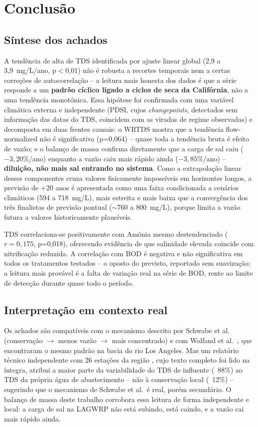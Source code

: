 \section{Conclusão}

\subsection{Síntese dos achados}

A tendência de alta de TDS identificada por ajuste linear global (2,9 a 3,9~mg/L/ano, p$<$0,01) não é robusta a recortes temporais nem a certas correções de autocorrelação -- a leitura mais honesta dos dados é que a série responde a um \textbf{padrão cíclico ligado a ciclos de seca da Califórnia}, não a uma tendência monotônica. Essa hipótese foi confirmada com uma variável climática externa e independente (PDSI, cujos \textit{changepoints}, detectados sem informação das datas do TDS, coincidem com as viradas de regime observadas) e decomposta em duas frentes causais: o WRTDS mostra que a tendência flow-normalized não é significativa (p=0,064) -- quase toda a tendência bruta é efeito de vazão; e o balanço de massa confirma diretamente que a carga de sal caiu ($-3{,}20\%$/ano) enquanto a vazão caiu mais rápido ainda ($-3{,}85\%$/ano) -- \textbf{diluição, não mais sal entrando no sistema}. Como a extrapolação linear desses componentes cruza valores fisicamente impossíveis em horizontes longos, a previsão de +20 anos é apresentada como uma faixa condicionada a cenários climáticos (594 a 718~mg/L), mais estreita e mais baixa que a convergência dos três finalistas de previsão pontual ($\sim$760 a 800~mg/L), porque limita a vazão futura a valores historicamente plausíveis.

TDS correlaciona-se positivamente com Amônia mesmo destendenciado ($r=0{,}175$, p=0,018), oferecendo evidência de que salinidade elevada coincide com nitrificação reduzida. A correlação com BOD é negativa e não significativa em todos os tratamentos testados -- o oposto do previsto, reportado sem suavização; a leitura mais provável é a falta de variação real na série de BOD, rente ao limite de detecção durante quase todo o período.

\subsection{Interpretação em contexto real}

Os achados são compatíveis com o mecanismo descrito por Schwabe et al.\ \cite{schwabe2020unintended} (conservação $\to$ menos vazão $\to$ mais concentrado) e com Wolfand et al.\ \cite{wolfand2022dilution}, que encontraram o mesmo padrão na bacia do rio Los Angeles. Mas um relatório técnico independente com 26 estações da região \cite{scsc2018tds}, cujo texto completo foi lido na íntegra, atribui a maior parte da variabilidade do TDS de influente (~88\%) ao TDS da própria água de abastecimento -- não à conservação local (~12\%) -- sugerindo que o mecanismo de Schwabe et al.\ é real, porém secundário. O balanço de massa deste trabalho corrobora essa leitura de forma independente e local: a carga de sal na LAGWRP não está subindo, está caindo, e a vazão cai mais rápido ainda.

